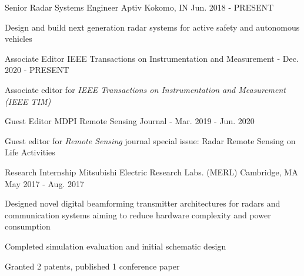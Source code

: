 
\begin{cventries}

    \cventry
        {Senior Radar Systems Engineer}
        {Aptiv}
        {Kokomo, IN}
        {Jun. 2018 - PRESENT}
        {
            \begin{cvitems}
                \item {Design and build next generation radar systems for active safety and autonomous vehicles}
            \end{cvitems}
        }
    
    \cventry
        {Associate Editor}
        {IEEE Transactions on Instrumentation and Measurement}
        {-}
        {Dec. 2020 - PRESENT}
        {
            \begin{cvitems}
                \item {Associate editor for \em{IEEE Transactions on Instrumentation and Measurement (IEEE TIM)}}
            \end{cvitems}
        }
        
    \cventry
        {Guest Editor}
        {MDPI Remote Sensing Journal}
        {-}
        {Mar. 2019 - Jun. 2020}
        {
            \begin{cvitems}
                \item {Guest editor for {\em{Remote Sensing}} journal special issue: Radar Remote Sensing on Life Activities}
            \end{cvitems}
        }

    \cventry
        {Research Internship}
        {Mitsubishi Electric Research Labs. (MERL)}
        {Cambridge, MA}
        {May 2017 - Aug. 2017}
        {
            \begin{cvitems}
                \item {Designed novel digital beamforming transmitter architectures for radars and communication systems aiming to reduce hardware complexity and power consumption}
                \item {Completed simulation evaluation and initial schematic design}
                \item {Granted 2 patents, published 1 conference paper}
            \end{cvitems}
        }

\end{cventries}

